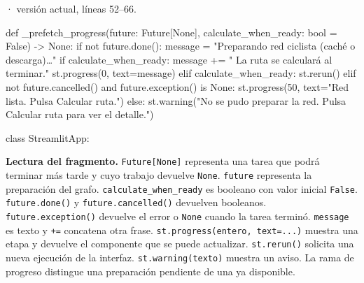 \documentclass[11pt,a4paper]{article}
\begin{document}
\smallskip
{\footnotesize\texttt{} · versión actual, líneas 52--66.}\par
\begin{Codigo}[firstnumber=52]
def _prefetch_progress(future: Future[None], calculate_when_ready: bool = False) -> None:
    if not future.done():
        message = "Preparando red ciclista (caché o descarga)…"
        if calculate_when_ready:
            message += " La ruta se calculará al terminar."
        st.progress(0, text=message)
    elif calculate_when_ready:
        st.rerun()
    elif not future.cancelled() and future.exception() is None:
        st.progress(50, text="Red lista. Pulsa Calcular ruta.")
    else:
        st.warning("No se pudo preparar la red. Pulsa Calcular ruta para ver el detalle.")


class StreamlitApp:
\end{Codigo}

\textbf{Lectura del fragmento.} \texttt{Future[None]} representa una tarea que podrá terminar más tarde y cuyo trabajo devuelve \texttt{None}. \texttt{future} representa la preparación del grafo. \texttt{calculate\_when\_ready} es booleano con valor inicial \texttt{False}. \texttt{future.done()} y \texttt{future.cancelled()} devuelven booleanos. \texttt{future.exception()} devuelve el error o \texttt{None} cuando la tarea terminó. \texttt{message} es texto y \texttt{+=} concatena otra frase. \texttt{st.progress(entero, text=...)} muestra una etapa y devuelve el componente que se puede actualizar. \texttt{st.rerun()} solicita una nueva ejecución de la interfaz. \texttt{st.warning(texto)} muestra un aviso. La rama de progreso distingue una preparación pendiente de una ya disponible.
\end{document}
